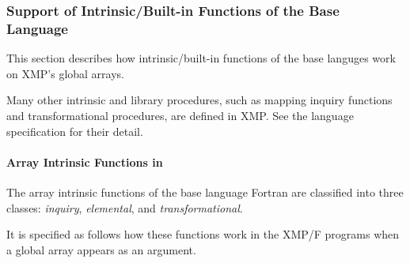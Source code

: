 




\subsubsection{Support of Intrinsic/Built-in Functions of the Base
	  Language}

This section describes how intrinsic/built-in functions of the base
languges work on XMP's global arrays.

Many other intrinsic and library procedures, such as mapping inquiry
functions and transformational procedures, are defined in XMP. See the
language specification for their detail.

\paragraph{Array Intrinsic Functions in {\XMPF}}

The array intrinsic functions of the base language Fortran are
classified into three classes: {\it inquiry}, {\it elemental}, and
{\it transformational}.

It is specified as follows how these functions work in the XMP/F
programs when a global array appears as an argument.

